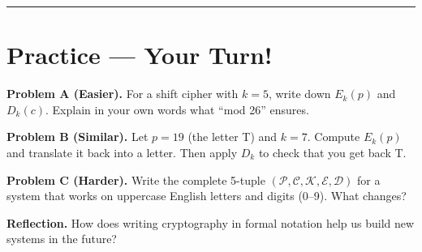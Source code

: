 \documentclass[12pt]{article}
\newcommand{\workbox}[1]{\fbox{\parbox{\dimexpr\textwidth-2\fboxsep-2\fboxrule\relax}{\vspace{#1}}}}
\begin{document}
\bigskip
\hrule
\vspace{0.5em}

\section*{Practice — Your Turn!}

\textbf{Problem A (Easier).}  
For a shift cipher with \(k = 5\), write down \(E_k(p)\) and \(D_k(c)\).  
Explain in your own words what “mod 26” ensures.  
\workbox{2cm}

\textbf{Problem B (Similar).}  
Let \(p = 19\) (the letter T) and \(k = 7\).  
Compute \(E_k(p)\) and translate it back into a letter.  
Then apply \(D_k\) to check that you get back T.  
\workbox{2.2cm}

\textbf{Problem C (Harder).}  
Write the complete 5-tuple \((\mathcal{P},\mathcal{C},\mathcal{K},\mathcal{E},\mathcal{D})\) for a system that works on
uppercase English letters and digits (0–9).  
What changes?  
\workbox{2.6cm}

\bigskip
\textbf{Reflection.}  
How does writing cryptography in formal notation help us build new systems in the future?  
\workbox{1.4cm}
\end{document}
